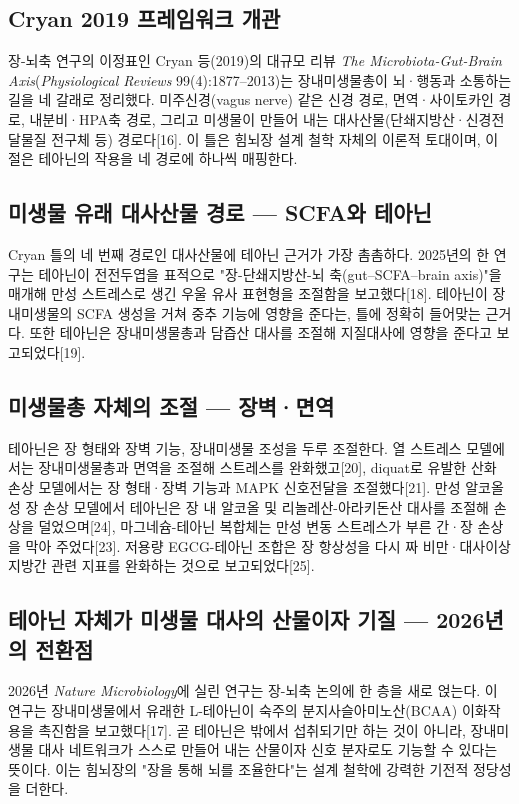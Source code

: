 \documentclass[12pt,oneside]{book}
\begin{document}
\subsection{Cryan 2019 프레임워크 개관}

장-뇌축 연구의 이정표인 Cryan 등(2019)의 대규모 리뷰 \textit{The Microbiota-Gut-Brain Axis}(\textit{Physiological Reviews} 99(4):1877–2013)는 장내미생물총이 뇌·행동과 소통하는 길을 네 갈래로 정리했다. 미주신경(vagus nerve) 같은 신경 경로, 면역·사이토카인 경로, 내분비·HPA축 경로, 그리고 미생물이 만들어 내는 대사산물(단쇄지방산·신경전달물질 전구체 등) 경로다[16]. 이 틀은 힘뇌장 설계 철학 자체의 이론적 토대이며, 이 절은 테아닌의 작용을 네 경로에 하나씩 매핑한다.

\subsection{미생물 유래 대사산물 경로 — SCFA와 테아닌}

Cryan 틀의 네 번째 경로인 대사산물에 테아닌 근거가 가장 촘촘하다. 2025년의 한 연구는 테아닌이 전전두엽을 표적으로 "장-단쇄지방산-뇌 축(gut–SCFA–brain axis)"을 매개해 만성 스트레스로 생긴 우울 유사 표현형을 조절함을 보고했다[18]. 테아닌이 장내미생물의 SCFA 생성을 거쳐 중추 기능에 영향을 준다는, 틀에 정확히 들어맞는 근거다. 또한 테아닌은 장내미생물총과 담즙산 대사를 조절해 지질대사에 영향을 준다고 보고되었다[19].

\subsection{미생물총 자체의 조절 — 장벽·면역}

테아닌은 장 형태와 장벽 기능, 장내미생물 조성을 두루 조절한다. 열 스트레스 모델에서는 장내미생물총과 면역을 조절해 스트레스를 완화했고[20], diquat로 유발한 산화 손상 모델에서는 장 형태·장벽 기능과 MAPK 신호전달을 조절했다[21]. 만성 알코올성 장 손상 모델에서 테아닌은 장 내 알코올 및 리놀레산-아라키돈산 대사를 조절해 손상을 덜었으며[24], 마그네슘-테아닌 복합체는 만성 변동 스트레스가 부른 간·장 손상을 막아 주었다[23]. 저용량 EGCG-테아닌 조합은 장 항상성을 다시 짜 비만·대사이상 지방간 관련 지표를 완화하는 것으로 보고되었다[25].

\subsection{테아닌 자체가 미생물 대사의 산물이자 기질 — 2026년의 전환점}

2026년 \textit{Nature Microbiology}에 실린 연구는 장-뇌축 논의에 한 층을 새로 얹는다. 이 연구는 장내미생물에서 유래한 L-테아닌이 숙주의 분지사슬아미노산(BCAA) 이화작용을 촉진함을 보고했다[17]. 곧 테아닌은 밖에서 섭취되기만 하는 것이 아니라, 장내미생물 대사 네트워크가 스스로 만들어 내는 산물이자 신호 분자로도 기능할 수 있다는 뜻이다. 이는 힘뇌장의 "장을 통해 뇌를 조율한다"는 설계 철학에 강력한 기전적 정당성을 더한다.
\end{document}
